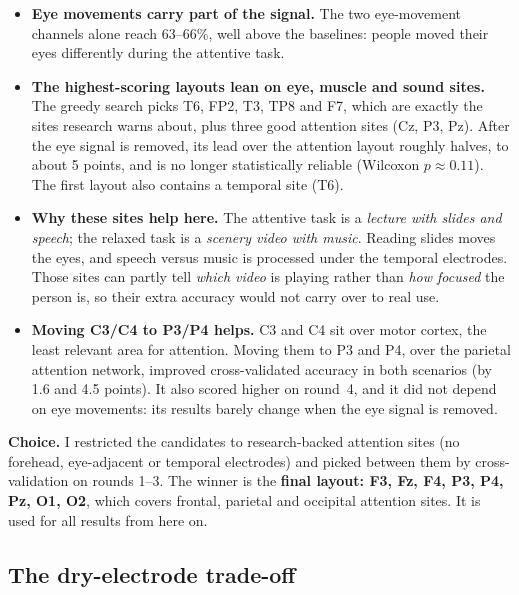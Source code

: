 \documentclass[12pt]{article}
\begin{document}
\begin{itemize}
    \item \textbf{Eye movements carry part of the signal.} The two eye-movement channels alone reach 63--66\%, well above the baselines: people moved their eyes differently during the attentive task.
    \item \textbf{The highest-scoring layouts lean on eye, muscle and sound sites.} The greedy search picks T6, FP2, T3, TP8 and F7, which are exactly the sites research warns about, plus three good attention sites (Cz, P3, Pz). After the eye signal is removed, its lead over the attention layout roughly halves, to about 5 points, and is no longer statistically reliable (Wilcoxon $p \approx 0.11$). The first layout also contains a temporal site (T6).
    \item \textbf{Why these sites help here.} The attentive task is a \emph{lecture with slides and speech}; the relaxed task is a \emph{scenery video with music}. Reading slides moves the eyes, and speech versus music is processed under the temporal electrodes. Those sites can partly tell \emph{which video} is playing rather than \emph{how focused} the person is, so their extra accuracy would not carry over to real use.
    \item \textbf{Moving C3/C4 to P3/P4 helps.} C3 and C4 sit over motor cortex, the least relevant area for attention. Moving them to P3 and P4, over the parietal attention network, improved cross-validated accuracy in both scenarios (by 1.6 and 4.5 points). It also scored higher on round~4, and it did not depend on eye movements: its results barely change when the eye signal is removed.
\end{itemize}

\textbf{Choice.} I restricted the candidates to research-backed attention sites (no forehead, eye-adjacent or temporal electrodes) and picked between them by cross-validation on rounds 1--3. The winner is the \textbf{final layout: F3, Fz, F4, P3, P4, Pz, O1, O2}, which covers frontal, parietal and occipital attention sites. It is used for all results from here on.

\subsection{The dry-electrode trade-off}
\end{document}
